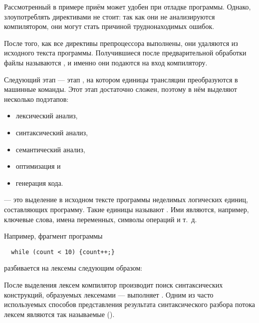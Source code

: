 Рассмотренный в примере приём может удобен при отладке программы.
Однако, злоупотреблять директивами не стоит: так как они не
анализируются компилятором, они могут стать причиной труднонаходимых
ошибок.

После того, как все директивы препроцессора выполнены, они удаляются
из исходного текста программы. Получившиеся после предварительной
обработки файлы называются , и именно они подаются на вход компилятору.

Следующий этап — этап , на котором
единицы трансляции преобразуются в машинные команды. Этот этап
достаточно сложен, поэтому в нём выделяют несколько подэтапов:

\begin{itemize}
\item лексический анализ,
\item синтаксический анализ,
\item семантический анализ,
\item оптимизация и
\item генерация кода.
\end{itemize}

 — это выделение в
исходном тексте программы неделимых логических единиц, составляющих
программу. Такие единицы называют . Ими
являются, например, ключевые слова, имена переменных, символы операций
и т.~д.

Например, фрагмент программы
\begin{lstlisting}
  while (count < 10) {count++;}
\end{lstlisting}
разбивается на лексемы следующим образом:


После выделения лексем компилятор производит поиск синтаксических
конструкций, образуемых лексемами — выполняет
. Одним из часто
используемых способов представления результата синтаксического разбора
потока лексем являются так называемые 
().

